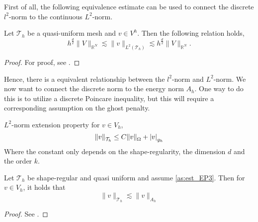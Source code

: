  First of all, the following equivalence estimate can be used to connect the discrete $l^{2}$-norm to the continuous $L^{2} $-norm.
 \begin{proposition}
 \label{prop:inverse_relation}
     Let $\mathcal{T}_{h} $ be a quasi-uniform mesh and $v \in V^{h}$. Then the following relation holds,
 \begin{equation}
 h^{\frac{d}{2}} \| V \|_{ \mathbb{R} ^{N} }^{  }  \lesssim \| v \|_{ L^2( \mathcal{T} _{h})  }^{  } \lesssim h^{\frac{d}{2}} \| V \|_{\mathbb{R} ^{N}  }^{  }.
 \end{equation}
 \end{proposition}
 \begin{proof}
     For proof, see \cite[Lemma A.1]{ern2006evaluation}.
 \end{proof}
 Hence, there is a equivalent relationship between the $l^{2} $-norm and $L^{2}$-norm. We now want to connect the discrete norm to the energy norm $A_{h}$. One way to do this is to utilize a discrete Poincare inequality, but this will require a corresponding
 assumption on the ghost penalty.

 \begin{assumption}[EP3]
     \label{as:est_EP3}
$L^2$-norm extension property for $ v \in  V_h$,
 \[
 \| v \|_{ \mathcal{T}_{h}  }^{  } \le  C \| v \|_{ \Omega  }^{  }  + \left\lvert  v  \right\rvert _{g_{h}}
 \]
 Where the constant only depends on the shape-regularity, the dimension $d$ and the order $k$.
 \end{assumption}


 \begin{proposition}
     Let $\mathcal{T}_{h} $ be shape-regular and quasi uniform and assume \ref{as:est_EP3}. Then for $v \in V_{h}$, it holds that \[
     \| v \|_{ \mathcal{T} _{h} }^{  } \lesssim \| v \|_{ A_{h} }^{  }
     \]

 \end{proposition}
\begin{proof}
    See \cite{gurkan2019stabilized}.
\end{proof}



